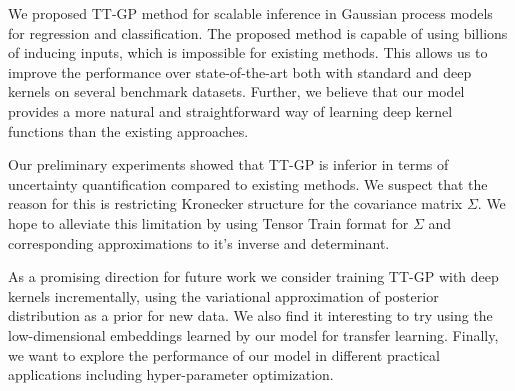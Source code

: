 We proposed TT-GP method for scalable inference in Gaussian process models
for regression and classification.  The proposed method is capable of using
billions of inducing inputs, which is impossible for existing methods. This allows us to improve the
performance over state-of-the-art both with standard and deep kernels
on several benchmark datasets. Further, we believe that our model provides a more natural and straightforward
way of learning deep kernel functions than the existing approaches.

Our preliminary experiments showed that TT-GP is inferior in terms of
uncertainty quantification compared to existing methods. We suspect that the
reason for this is restricting Kronecker structure for the covariance matrix $\Sigma$. We hope to
alleviate this limitation by using Tensor Train format for $\Sigma$ and corresponding approximations to it's inverse and determinant.

As a promising direction for future work we consider training TT-GP
with deep kernels incrementally, using the variational approximation
of posterior distribution as a prior for new data. We also find it interesting
to try using the low-dimensional embeddings learned by our model for transfer learning. Finally, we want to
explore the performance of our model in different practical applications including hyper-parameter optimization.
